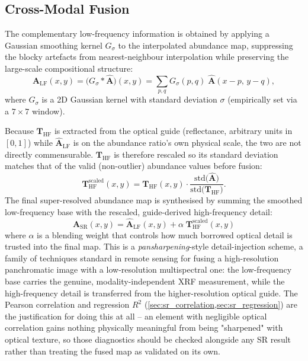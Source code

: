 \documentclass[journal,lettersize]{IEEEtran}
\begin{document}
\subsection{Cross-Modal Fusion}\label{sec:sr_fusion}

The complementary low-frequency information is obtained by applying a
Gaussian smoothing kernel $G_\sigma$ to the interpolated abundance map,
suppressing the blocky artefacts from nearest-neighbour interpolation
while preserving the large-scale compositional structure:
\begin{equation}\label{eq:smooth}
  \hat{\mathbf{A}}_{\mathrm{LF}}(x,y)
    = \bigl(G_\sigma * \hat{\mathbf{A}}\bigr)(x,y)
    = \sum_{p,q} G_\sigma(p,q)\;\hat{\mathbf{A}}(x-p,\,y-q),
\end{equation}
where $G_\sigma$ is a 2D Gaussian kernel with standard deviation
$\sigma$ (empirically set via a $7 \times 7$ window).

Because $\mathbf{T}_{\mathrm{HF}}$ is extracted from the optical guide
(reflectance, arbitrary units in $[0,1]$) while $\hat{\mathbf{A}}_{\mathrm{LF}}$
is on the abundance ratio's own physical scale, the two are not directly
commensurable. $\mathbf{T}_{\mathrm{HF}}$ is therefore rescaled so its
standard deviation matches that of the valid (non-outlier) abundance
values before fusion:
\begin{equation}\label{eq:rescale}
  \mathbf{T}_{\mathrm{HF}}^{\mathrm{scaled}}(x,y)
    = \mathbf{T}_{\mathrm{HF}}(x,y)\cdot
      \frac{\mathrm{std}\bigl(\hat{\mathbf{A}}\bigr)}
           {\mathrm{std}\bigl(\mathbf{T}_{\mathrm{HF}}\bigr)}.
\end{equation}
The final super-resolved abundance map is synthesised by summing the
smoothed low-frequency base with the rescaled, guide-derived
high-frequency detail:
\begin{equation}\label{eq:fusion}
  \boxed{
    \mathbf{A}_{\mathrm{SR}}(x,y)
      = \hat{\mathbf{A}}_{\mathrm{LF}}(x,y)
      + \alpha\;\mathbf{T}_{\mathrm{HF}}^{\mathrm{scaled}}(x,y)
  }
\end{equation}
where $\alpha$ is a blending weight that controls how much borrowed
optical detail is trusted into the final map. This is a
\emph{pansharpening}-style detail-injection scheme, a family of
techniques standard in remote sensing for fusing a high-resolution
panchromatic image with a low-resolution multispectral one: the
low-frequency base carries the genuine, modality-independent XRF
measurement, while the high-frequency detail is transferred from the
higher-resolution optical guide. The Pearson correlation and regression
$R^2$
(\cref{sec:sr_correlation,sec:sr_regression}) are the justification for
doing this at all -- an element with negligible optical correlation gains
nothing physically meaningful from being "sharpened" with optical
texture, so those diagnostics should be checked alongside any SR result
rather than treating the fused map as validated on its own.
\end{document}
